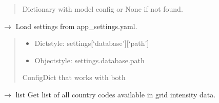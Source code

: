 \documentclass[letterpaper,10pt,english]{sphinxmanual}
\begin{document}
\begin{fulllineitems}
\begin{fulllineitems}
\begin{quote}
\begin{description}
\begin{itemize}
\end{itemize}

\sphinxAtStartPar
Dictionary with model config or None if not found.

\end{description}\end{quote}

\end{fulllineitems}


\begin{fulllineitems}
\label{\detokenize{core.config_loader:core.config_loader.ConfigLoader.get_settings}}
\pysigstartsignatures
\pysiglinewithargsret
{}
{}
{{ $\rightarrow$ {\hyperref[\detokenize{core.config_loader:core.config_loader.ConfigDict}]{}}}}
\pysigstopsignatures
\sphinxAtStartPar
Load settings from app\_settings.yaml.
\begin{quote}\begin{description}
\sphinxAtStartPar
\begin{itemize}
\item {} 
\sphinxAtStartPar
Dict\sphinxhyphen{}style: settings{[}‘database’{]}{[}‘path’{]}

\item {} 
\sphinxAtStartPar
Object\sphinxhyphen{}style: settings.database.path

\end{itemize}


\sphinxAtStartPar
ConfigDict that works with both

\end{description}\end{quote}

\end{fulllineitems}


\begin{fulllineitems}
\label{\detokenize{core.config_loader:core.config_loader.ConfigLoader.list_available_countries}}
\pysigstartsignatures
\pysiglinewithargsret
{}
{}
{{ $\rightarrow$ list}}
\pysigstopsignatures
\sphinxAtStartPar
Get list of all country codes available in grid intensity data.


\end{fulllineitems}
\end{fulllineitems}
\end{document}
